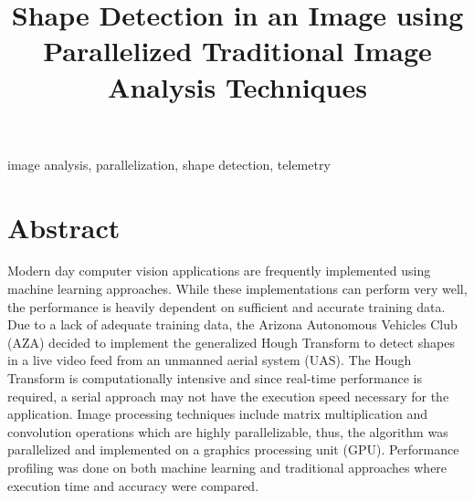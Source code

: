 \documentclass[conference]{IEEEtran}
\begin{document}
\title{Shape Detection in an Image using Parallelized Traditional Image Analysis Techniques\\
}

\author{
\and
}

\maketitle


\begin{IEEEkeywords}
image analysis, parallelization, shape detection, telemetry
\end{IEEEkeywords}

\section*{Abstract}
Modern day computer vision applications are frequently implemented using machine learning approaches. While these implementations can perform very well, the performance is heavily dependent on sufficient and accurate training data. Due to a lack of adequate training data, the Arizona Autonomous Vehicles Club (AZA) decided to implement the generalized Hough Transform to detect shapes in a live video feed from an unmanned aerial system (UAS). The Hough Transform is computationally intensive and since real-time performance is required, a serial approach may not have the execution speed necessary for the application. Image processing techniques include matrix multiplication and convolution operations which are highly parallelizable, thus, the algorithm was parallelized and implemented on a graphics processing unit (GPU). Performance profiling was done on both machine learning and traditional approaches where execution time and accuracy were compared.
\end{document}
